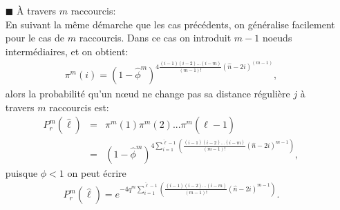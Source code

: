 \begin{itemize}
	
\item[$\blacksquare$] \`{A} travers $m$ raccourcis:\\
En suivant la même démarche que les cas précédents, on généralise facilement pour le cas de $m$ raccourcis. Dans ce cas on introduit $m-1$ noeuds intermédiaires, et on obtient: 
\begin{eqnarray}
	\pi^m(i)=(1-\hat{\phi}^m)^{4\frac{(i-1)(i-2)\ldots(i-m)}{(m-1)!}(\hat{n}-2i)^{(m-1)}},
\end{eqnarray}
alors la probabilité qu'un nœud ne change pas sa distance régulière $j$ à travers $m$ raccourcis est:
\begin{eqnarray}
	P_r^m(\hat{\ell})&=&\pi^m(1)\pi^m(2)...\pi^m(\hat{\ell}-1)\\\nonumber
	&=& (1-\hat{\phi}^m)^{4\sum_{i=1}^{\hat{\ell}-1}(\frac{(i-1)(i-2)\ldots(i-m)}{(m-1)!}(\hat{n}-2i)^{m-1})},
	\end{eqnarray}
puisque $\hat{\phi}<1$ on peut écrire 
\begin{eqnarray}
P_r^m(\hat{\ell})=e^{-4q^m\sum_{i=1}^{\hat{\ell}-1}(\frac{(i-1)(i-2)\ldots(i-m)}{(m-1)!}(\hat{n}-2i)^{m-1})}.
\end{eqnarray}
\end{itemize}
